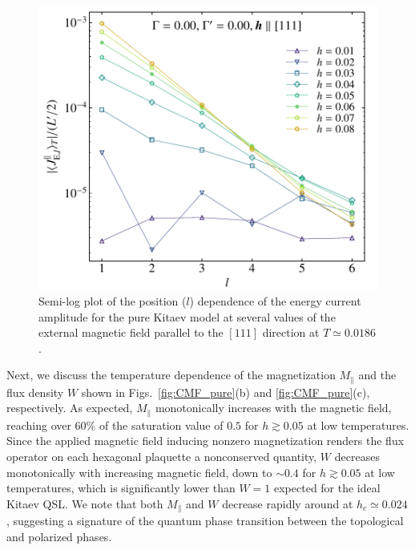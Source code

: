 \documentclass[twocolumn,superscriptaddress,showpacs, longbibliography, aps, prx]{revtex4-2}
\begin{document}
\begin{figure}[tbh]
  \begin{center}
    \includegraphics[width=\linewidth]{Data_for_figs/plot/fig-07-XTRG-Jline-abs-log.pdf}
  \end{center}
  \caption{Semi-log plot of the position ($l$) dependence of the energy current amplitude for the pure Kitaev model at several values of the external magnetic field parallel to the $[111]$ direction at $T \simeq 0.0186$.} 
  \label{fig:J_line_dep}
\end{figure}

Next, we discuss the temperature dependence of the magnetization $M_\parallel$ and the flux density $W$ shown in Figs.~\ref{fig:CMF_pure}(b) and \ref{fig:CMF_pure}(c), respectively. 
As expected, $M_\parallel$ monotonically increases with the magnetic field, reaching over 60\% of the saturation value of $0.5$ for $h\gtrsim 0.05$ at low temperatures. 
Since the applied magnetic field inducing nonzero magnetization renders the flux operator on each hexagonal plaquette a nonconserved quantity, $W$ decreases monotonically with increasing magnetic field, down to $\sim 0.4$ for $h\gtrsim 0.05$ at low temperatures, which is significantly lower than $W=1$ expected for the ideal Kitaev QSL.
We note that both $M_{\parallel}$ and $W$ decrease rapidly around at $h_c \simeq 0.024$, suggesting a signature of the quantum phase transition between the topological and polarized phases. 
\end{document}
